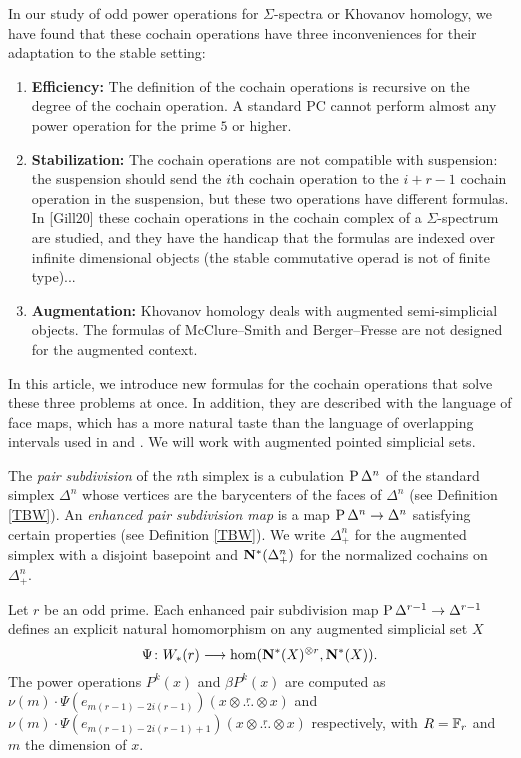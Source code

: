 In our study of odd power operations for $\Sigma$-spectra or Khovanov homology, we have found that these cochain operations have three inconveniences for their adaptation to the stable setting:
\begin{enumerate}
\item {\bf Efficiency:} The definition of the cochain operations is recursive on the degree of the cochain operation. A standard PC cannot perform almost any power operation for the prime $5$ or higher. 
\item {\bf Stabilization:} The cochain operations are not compatible with suspension: the suspension should send the $i$th cochain operation to the $i+r-1$ cochain operation in the suspension, but these two operations have different formulas. In [Gill20] these cochain operations in the cochain complex of a $\Sigma$-spectrum are studied, and they have the handicap that the formulas are indexed over infinite dimensional objects (the stable commutative operad is not of finite type)...
\item {\bf Augmentation:} Khovanov homology deals with augmented semi-simplicial objects. The formulas of McClure--Smith and Berger--Fresse are not designed for the augmented context. 
\end{enumerate}
In this article, we introduce new formulas for the cochain operations that solve these three problems at once. In addition, they are described with the language of face maps, which has a more natural taste than the language of overlapping intervals used in \cite{MS02} and \cite{BF03}. We will work with augmented pointed simplicial sets.

The \emph{pair subdivision} of the $n$th simplex is a cubulation $\operatorname{P} \Delta^n$ of the standard simplex $\Delta^n$ whose vertices are the barycenters of the faces of $\Delta^n$ (see Definition \ref{TBW}). An \emph{enhanced pair subdivision map} is a map $\operatorname{P} \Delta^n\to \Delta^n$ satisfying certain properties (see Definition \ref{TBW}). We write $\Delta^n_+$ for the augmented simplex with a disjoint basepoint and $\mathbf{N}^*(\Delta^n_+)$ for the normalized cochains on $\Delta^n_+$. %
\begin{theorem} 
	Let $r$ be an odd prime. Each enhanced pair subdivision map $\operatorname{P} \Delta^{r-1}\to \Delta^{r-1}$ defines an explicit natural homomorphism on any augmented simplicial set $X$
	\[\Psi\colon W_*(r)\longrightarrow \hom(\mathbf{N}^*(X)^{\otimes r},\mathbf{N}^*(X)).\]
	The power operations $P^k(x)$ and $\beta P^k(x)$ are computed as $\nu(m)\cdot \Psi(e_{m(r-1)-2i(r-1)})(x\otimes\overset{r}{\ldots}\otimes x)$ and $\nu(m)\cdot \Psi(e_{m(r-1)-2i(r-1)+1})(x\otimes\overset{r}{\ldots}\otimes x)$ respectively, with $R=\mathbb{F}_r$ and $m$ the dimension of $x$.
\end{theorem}


